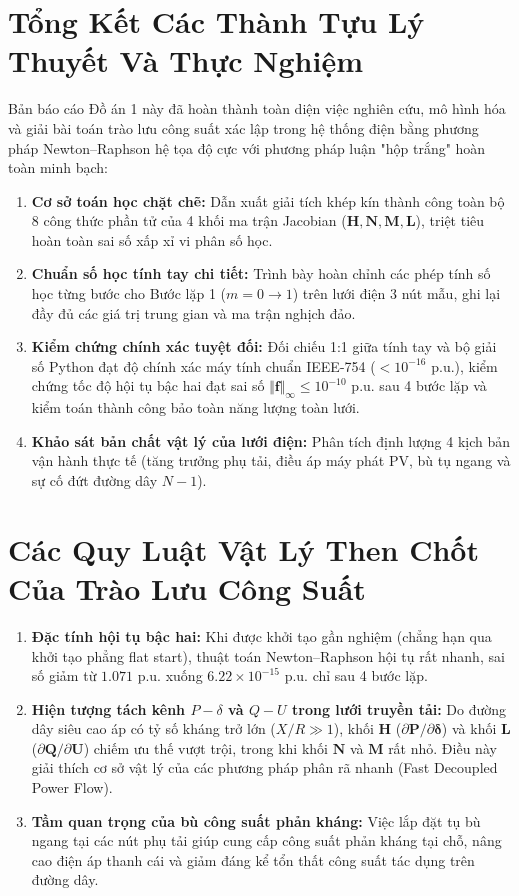 \documentclass[12pt,a4paper,oneside]{report}
\begin{document}
\section{Tổng Kết Các Thành Tựu Lý Thuyết Và Thực Nghiệm}
Bản báo cáo Đồ án 1 này đã hoàn thành toàn diện việc nghiên cứu, mô hình hóa và giải bài toán trào lưu công suất xác lập trong hệ thống điện bằng phương pháp Newton--Raphson hệ tọa độ cực với phương pháp luận "hộp trắng" hoàn toàn minh bạch:
\begin{enumerate}
    \item \textbf{Cơ sở toán học chặt chẽ:} Dẫn xuất giải tích khép kín thành công toàn bộ 8 công thức phần tử của 4 khối ma trận Jacobian ($\mathbf{H}, \mathbf{N}, \mathbf{M}, \mathbf{L}$), triệt tiêu hoàn toàn sai số xấp xỉ vi phân số học.
    \item \textbf{Chuẩn số học tính tay chi tiết:} Trình bày hoàn chỉnh các phép tính số học từng bước cho Bước lặp 1 ($m = 0 \to 1$) trên lưới điện 3 nút mẫu, ghi lại đầy đủ các giá trị trung gian và ma trận nghịch đảo.
    \item \textbf{Kiểm chứng chính xác tuyệt đối:} Đối chiếu 1:1 giữa tính tay và bộ giải số Python đạt độ chính xác máy tính chuẩn IEEE-754 ($< 10^{-16}\text{ p.u.}$), kiểm chứng tốc độ hội tụ bậc hai đạt sai số $\Vert \mathbf{f} \Vert_\infty \le 10^{-10}\text{ p.u.}$ sau 4 bước lặp và kiểm toán thành công bảo toàn năng lượng toàn lưới.
    \item \textbf{Khảo sát bản chất vật lý của lưới điện:} Phân tích định lượng 4 kịch bản vận hành thực tế (tăng trưởng phụ tải, điều áp máy phát PV, bù tụ ngang và sự cố đứt đường dây $N-1$).
\end{enumerate}

\section{Các Quy Luật Vật Lý Then Chốt Của Trào Lưu Công Suất}
\begin{enumerate}
    \item \textbf{Đặc tính hội tụ bậc hai:} Khi được khởi tạo gần nghiệm (chẳng hạn qua khởi tạo phẳng flat start), thuật toán Newton--Raphson hội tụ rất nhanh, sai số giảm từ $1.071\text{ p.u.}$ xuống $6.22 \times 10^{-15}\text{ p.u.}$ chỉ sau 4 bước lặp.
    \item \textbf{Hiện tượng tách kênh $P-\delta$ và $Q-U$ trong lưới truyền tải:} Do đường dây siêu cao áp có tỷ số kháng trở lớn ($X/R \gg 1$), khối $\mathbf{H}$ ($\partial \mathbf{P} / \partial \boldsymbol{\delta}$) và khối $\mathbf{L}$ ($\partial \mathbf{Q} / \partial \mathbf{U}$) chiếm ưu thế vượt trội, trong khi khối $\mathbf{N}$ và $\mathbf{M}$ rất nhỏ. Điều này giải thích cơ sở vật lý của các phương pháp phân rã nhanh (Fast Decoupled Power Flow).
    \item \textbf{Tầm quan trọng của bù công suất phản kháng:} Việc lắp đặt tụ bù ngang tại các nút phụ tải giúp cung cấp công suất phản kháng tại chỗ, nâng cao điện áp thanh cái và giảm đáng kể tổn thất công suất tác dụng trên đường dây.
\end{enumerate}
\end{document}
